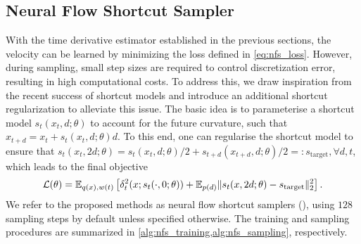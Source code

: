 \subsection{Neural Flow Shortcut Sampler}
With the time derivative estimator established in the previous sections, the velocity can be learned by minimizing the loss defined in \cref{eq:nfs_loss}. However, during sampling, small step sizes are required to control discretization error, resulting in high computational costs. To address this, we draw inspiration from the recent success of shortcut models \citep{frans2024one} and introduce an additional shortcut regularization to alleviate this issue.
The basic idea is to parameterise a shortcut model $s_t (x_t, d;\theta)$ to account for the future curvature, such that $x_{t+d} = x_t + s_t (x_t, d; \theta)d$. To this end, one can regularise the shortcut model to ensure that $s_t (x_t, 2d;\theta) = s_t (x_t, d;\theta)/2 + s_{t+d} (x_{t+d}, d;\theta)/2 =: s_{\text{target}}, \forall d,t$, which leads to the final objective
\begin{align} \label{eq:loss-nfs2}
    \mathcal{L}(\theta) = {\mathbb E}_{q(x), w(t)} \left[ \delta_t^2(x; s_t(\cdot, 0;\theta)) + {\mathbb E}_{p(d)} \lVert s_t(x, 2d;\theta) - s_{\text{target}} \rVert_2^2 \right].
\end{align}
We refer to the proposed methods as neural flow shortcut samplers (\ours), using $128$ sampling steps by default unless specified otherwise.
The training and sampling procedures are summarized in \cref{alg:nfs_training,alg:nfs_sampling}, respectively.